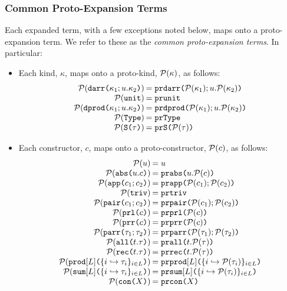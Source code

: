 \subsubsection{Common Proto-Expansion Terms}
Each expanded term, with a few exceptions noted below, maps onto a proto-expansion term. We refer to these as the \emph{common proto-expansion terms}. In particular:
\begin{itemize}
  \item Each kind, $\kappa$, maps onto a proto-kind, $\mathcal{P}(\kappa)$, as follows:
  \[\arraycolsep=1pt\begin{array}{rl}
  \Cof{\akdarr{\kappa_1}{u}{\kappa_2}} & = \acekdarr{\Cof{\kappa_1}}{u}{\Cof{\kappa_2}}\\
  \Cof{\akunit} & = \acekunit\\
  \Cof{\akdbprod{\kappa_1}{u}{\kappa_2}} & = \acekdbprod{\Cof{\kappa_1}}{u}{\Cof{\kappa_2}}\\
  \Cof{\akty} & = \acekty\\
  \Cof{\aksing{\tau}} & = \aceksing{\Cof{\tau}}
  \end{array}\]
  \item Each constructor, $c$, maps onto a proto-constructor, $\mathcal{P}(c)$, as follows:
  \[\arraycolsep=1pt\begin{array}{rl}
  \Cof{u} & = u\\
  \Cof{\acabs{u}{c}} & = \acecabs{u}{\Cof{c}}\\
  \Cof{\acapp{c_1}{c_2}} & = \acecapp{\Cof{c_1}}{\Cof{c_2}}\\
  \Cof{\actriv} & = \acectriv\\
  \Cof{\acpair{c_1}{c_2}} & = \acecpair{\Cof{c_1}}{\Cof{c_2}}\\
  \Cof{\acprl{c}} & = \acecprl{\Cof{c}}\\
  \Cof{\acprr{c}} & = \acecprr{\Cof{c}}\\
  \Cof{\aparr{\tau_1}{\tau_2}} & = \aceparr{\Cof{\tau_1}}{\Cof{\tau_2}}\\
  \Cof{\aall{t}{\tau}} & = \aceall{t}{\Cof{\tau}}\\
  \Cof{\arec{t}{\tau}} & = \acerec{t}{\Cof{\tau}}\\
  \Cof{\aprod{\labelset}{\mapschema{\tau}{i}{\labelset}}} & = \aceprod{\labelset}{\mapschemax{\Cofv}{\tau}{i}{\labelset}}\\
  \Cof{\asum{\labelset}{\mapschema{\tau}{i}{\labelset}}} & = \acesum{\labelset}{\mapschemax{\Cofv}{\tau}{i}{\labelset}}\\
  \Cof{\amcon{X}} & = \acemcon{X}
  \end{array}\]

\end{itemize}
